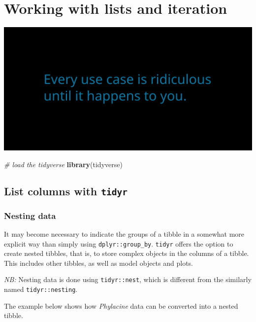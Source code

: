 \documentclass[]{book}
\newenvironment{Shaded}{}{}
\newcommand{\CommentTok}[1]{\textcolor[rgb]{0.38,0.63,0.69}{\textit{#1}}}
\newcommand{\KeywordTok}[1]{\textcolor[rgb]{0.00,0.44,0.13}{\textbf{#1}}}
\newcommand{\NormalTok}[1]{#1}
\begin{document}
\hypertarget{working-with-lists-and-iteration}{%
\chapter{Working with lists and iteration}\label{working-with-lists-and-iteration}}

\includegraphics{opening-image.png}

\begin{Shaded}
\begin{Highlighting}[]
\CommentTok{# load the tidyverse}
\KeywordTok{library}\NormalTok{(tidyverse)}
\end{Highlighting}
\end{Shaded}

\hypertarget{list-columns-with-tidyr}{%
\section{\texorpdfstring{List columns with \texttt{tidyr}}{List columns with tidyr}}\label{list-columns-with-tidyr}}

\hypertarget{nesting-data}{%
\subsection{Nesting data}\label{nesting-data}}

It may become necessary to indicate the groups of a tibble in a somewhat more explicit way than simply using \texttt{dplyr::group\_by}. \texttt{tidyr} offers the option to create nested tibbles, that is, to store complex objects in the columns of a tibble. This includes other tibbles, as well as model objects and plots.

\emph{NB:} Nesting data is done using \texttt{tidyr::nest}, which is different from the similarly named \texttt{tidyr::nesting}.

The example below shows how \emph{Phylacine} data can be converted into a nested tibble.
\end{document}
